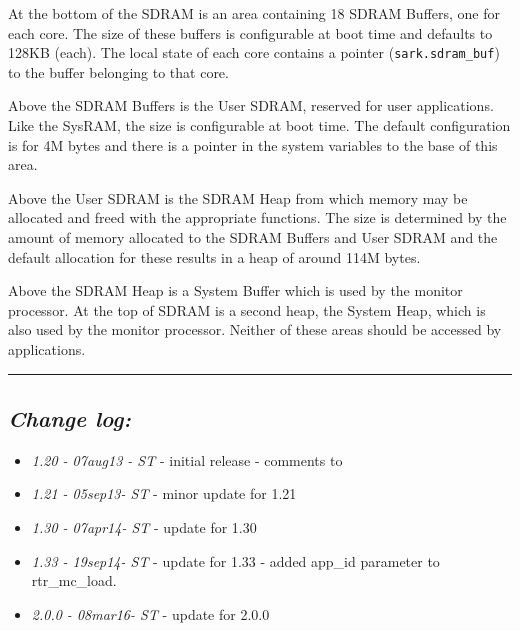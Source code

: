
At the bottom of the SDRAM is an area containing 18 SDRAM Buffers,
one for each core. The size of these buffers is configurable at boot
time and defaults to 128KB (each). The local state of each core
contains a pointer (\texttt{sark.sdram\_buf}) to the buffer belonging
to that core.

Above the SDRAM Buffers is the User SDRAM, reserved for user
applications. Like the SysRAM, the size is configurable at boot
time. The default configuration is for 4M bytes and there is a pointer
in the system variables to the base of this area.

Above the User SDRAM is the SDRAM Heap from which memory may be
allocated and freed with the appropriate functions. The size is
determined by the amount of memory allocated to the SDRAM Buffers and
User SDRAM and the default allocation for these results in
a heap of around 114M bytes.

Above the SDRAM Heap is a System Buffer which is used by the monitor
processor. At the top of SDRAM is a second heap, the System Heap,
which is also used by the monitor processor. Neither of these areas
should be accessed by applications.

\rule{\linewidth}{1pt}

\subsection{\itshape Change log:}

\begin{itemize}
\item {\itshape 1.20 - 07aug13 - ST} - initial release - comments to
  {\itshape \Email}
\item {\itshape 1.21 - 05sep13- ST} - minor update for 1.21
\item {\itshape 1.30 - 07apr14- ST} - update for 1.30
\item {\itshape 1.33 - 19sep14- ST} - update for 1.33 - added app\_id
parameter to rtr\_mc\_load.
\item {\itshape 2.0.0 - 08mar16- ST} - update for 2.0.0
        
\end{itemize}


